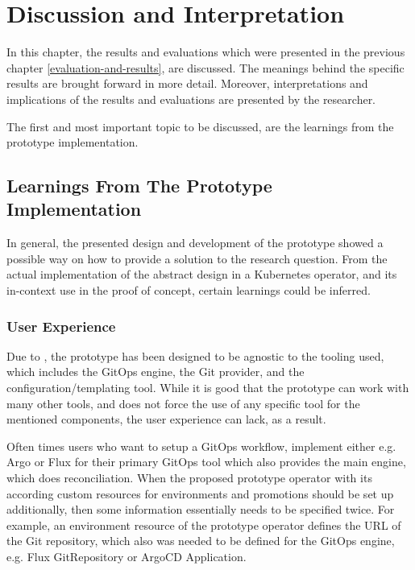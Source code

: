 \chapter{Discussion and Interpretation}
\label{discussion-and-interpretation}

In this chapter,
the results and evaluations which were presented in the previous chapter \ref{evaluation-and-results},
are discussed. The meanings behind the specific results are brought forward in more detail.
Moreover, interpretations and implications of the results and evaluations are presented by the researcher.

The first and most important topic to be discussed,
are the learnings from the prototype implementation.

\section*{Learnings From The Prototype Implementation}

In general, the presented design and development of the prototype
showed a possible way on how to provide a solution to the research question.
From the actual implementation of the abstract design in a Kubernetes operator,
and its in-context use in the proof of concept,
certain learnings could be inferred.

\subsection*{User Experience}

Due to ,
the prototype has been designed to be agnostic to the tooling used, which includes the GitOps engine, the Git provider, and the configuration/templating tool.
While it is good that the prototype can work with many other tools,
and does not force the use of any specific tool for the mentioned components,
the user experience can lack, as a result.

Often times users who want to setup a GitOps workflow,
implement either e.g. Argo or Flux for their primary GitOps tool which also provides the main engine,
which does reconciliation.
When the proposed prototype operator with its according custom resources for environments and promotions
should be set up additionally,
then some information essentially needs to be specified twice. For example,
an environment resource of the prototype operator defines the URL of the Git repository,
which also was needed to be defined for the GitOps engine, e.g. Flux GitRepository or ArgoCD Application.

